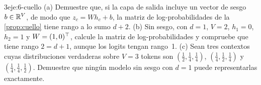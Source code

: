 \begin{ejercicio}{3}{eje:6-cuello}
(a) Demuestre que, si la capa de salida incluye un vector de sesgo $b\in\mathbb{R}^{V}$, de modo que $z_c=Wh_c+b$, la matriz de log-probabilidades de la \cref{prop:cuello} tiene rango a lo sumo $d+2$. (b) Sin sesgo, con $d=1$, $V=2$, $h_1=0$, $h_2=1$ y $W=(1,0)^{\top}$, calcule la matriz de log-probabilidades y compruebe que tiene rango $2=d+1$, aunque los logits tengan rango~1. (c) Sean tres contextos cuyas distribuciones verdaderas sobre $V=3$ tokens son $(\tfrac12,\tfrac14,\tfrac14)$, $(\tfrac14,\tfrac12,\tfrac14)$ y $(\tfrac14,\tfrac14,\tfrac12)$. Demuestre que ningún modelo sin sesgo con $d=1$ puede representarlas exactamente.
\end{ejercicio}

